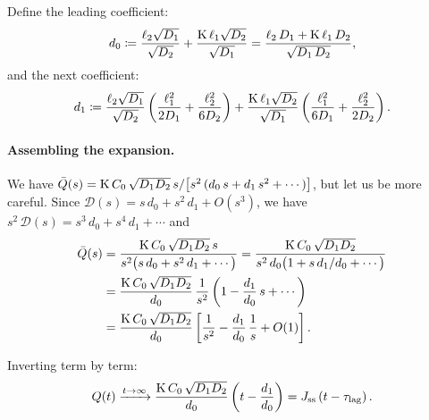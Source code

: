 Define the leading coefficient:
\begin{equation}
  \label{eq:d0-def}
  d_0 \coloneqq \frac{\ell_{2}\sqrt{D_{1}}}{\sqrt{D_{2}}}
  + \frac{\mathrm{K}\,\ell_{1}\sqrt{D_{2}}}{\sqrt{D_{1}}}
  = \frac{\ell_{2}\,D_{1} + \mathrm{K}\,\ell_{1}\,D_{2}}
  {\sqrt{D_{1}\,D_{2}}},
\end{equation}
and the next coefficient:
\begin{equation}
  \label{eq:d1-def}
  d_1 \coloneqq
  \frac{\ell_{2}\sqrt{D_{1}}}{\sqrt{D_{2}}}
  \left(\frac{\ell_{1}^2}{2D_{1}} + \frac{\ell_{2}^2}{6D_{2}}\right)
  + \frac{\mathrm{K}\,\ell_{1}\sqrt{D_{2}}}{\sqrt{D_{1}}}
  \left(\frac{\ell_{1}^2}{6D_{1}} + \frac{\ell_{2}^2}{2D_{2}}\right).
\end{equation}

\paragraph{Assembling the expansion.}  We have
$\bar{Q}(s) = \mathrm{K}\,C_0\,\sqrt{D_{1}D_{2}}\,s /
\bigl[s^2\,(d_0\,s + d_1\,s^2 + \cdots)\bigr]$, but let us be more careful.
Since $\mathcal{D}(s) = s\,d_0 + s^2\,d_1 + O(s^3)$, we have
$s^2\,\mathcal{D}(s) = s^3\,d_0 + s^4\,d_1 + \cdots$ and
\begin{align}
  \bar{Q}(s)
  &= \frac{\mathrm{K}\,C_0\,\sqrt{D_{1}D_{2}}\,s}
  {s^2\bigl(s\,d_0 + s^2\,d_1 + \cdots\bigr)}
  = \frac{\mathrm{K}\,C_0\,\sqrt{D_{1}D_{2}}}
  {s^2\,d_0\bigl(1 + s\,d_1/d_0 + \cdots\bigr)}
  \notag\\
  &= \frac{\mathrm{K}\,C_0\,\sqrt{D_{1}D_{2}}}{d_0}\,
  \frac{1}{s^2}\left(1 - \frac{d_1}{d_0}\,s + \cdots\right)
  \notag\\
  &= \frac{\mathrm{K}\,C_0\,\sqrt{D_{1}D_{2}}}{d_0}
  \left[\frac{1}{s^2} - \frac{d_1}{d_0}\,\frac{1}{s}
    + O(1)\right].
  \label{eq:Qbar-expanded}
\end{align}

Inverting term by term:
\begin{equation}
  \label{eq:Q-asymptote-two-layer}
  Q(t) \xrightarrow{t\to\infty}
  \frac{\mathrm{K}\,C_0\,\sqrt{D_{1}D_{2}}}{d_0}
  \left(t - \frac{d_1}{d_0}\right)
  = J_{\mathrm{ss}}\left(t - \tau_{\mathrm{lag}}\right).
\end{equation}

